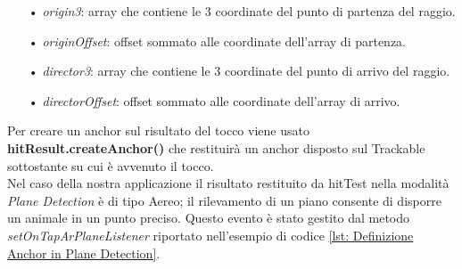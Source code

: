 \documentclass[crop=false, class=book]{standalone}
\begin{document}
	\begin{itemize}
		\item[•] \emph{origin3}: array che contiene le 3 coordinate del punto di partenza del raggio.
		\item[•] \emph{originOffset}: offset sommato alle coordinate dell'array di partenza.
		\item[•] \emph{director3}: array che contiene le 3 coordinate del punto di arrivo del raggio.
		\item[•] \emph{directorOffset}: offset sommato alle coordinate dell'array di arrivo.
	\end{itemize}
	
	\begin{flushleft}
		Per creare un anchor sul risultato del tocco viene usato \textbf{hitResult.createAnchor()} che restituirà un anchor disposto sul Trackable sottostante su cui è avvenuto il tocco.\\
		Nel caso della nostra applicazione il risultato restituito da hitTest nella modalità \emph{Plane Detection} è di tipo Aereo; il rilevamento di un piano consente di disporre un animale in un punto preciso. Questo evento è stato 					gestito dal metodo \textit{setOnTapArPlaneListener} riportato nell'esempio di codice \vref{lst: Definizione Anchor in Plane Detection}.\\
	\end{flushleft}
			
	
\end{document}
